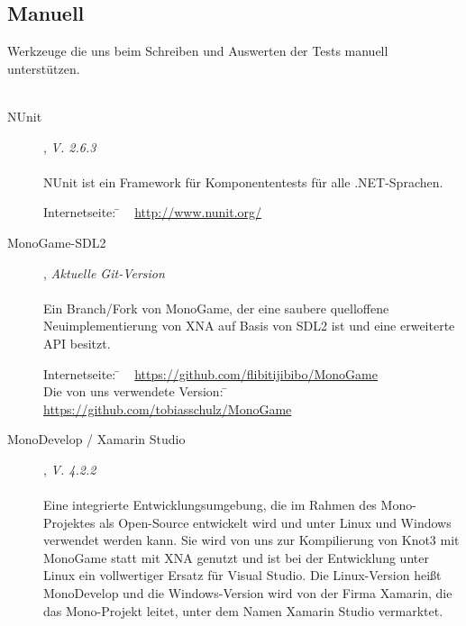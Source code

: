 
\subsection{Manuell}
\label{Abschnitt:Programmfehler:Werkzeuge:Manuell}

Werkzeuge die uns beim Schreiben und Auswerten der Tests manuell unterstützen.
\\
\\

\begin{description}

	\item[NUnit], \textit{V. 2.6.3}\hfill
	\\
	\\
	NUnit ist ein Framework für Komponententests für alle .NET-Sprachen.
	
	\begin{tabbing}
		Internetseite:
		\= ~ \href {http://www.nunit.org/}
	    	       {http://www.nunit.org/}
	    \\
	\end{tabbing}
	
	\item[MonoGame-SDL2], \textit{Aktuelle Git-Version}\hfill
	\\
	\\
	Ein Branch/Fork von MonoGame, der eine saubere quelloffene Neuimplementierung von XNA auf Basis von SDL2 ist und eine erweiterte API besitzt.
	
	\begin{tabbing}
		Internetseite:
		\= ~ \href {https://github.com/flibitijibibo/MonoGame}
	    	       {https://github.com/flibitijibibo/MonoGame}
	    \\
		Die von uns verwendete Version:
		\= ~ \href {https://github.com/tobiasschulz/MonoGame}
	    	       {https://github.com/tobiasschulz/MonoGame}
	    \\
	\end{tabbing}
	
	\item[MonoDevelop / Xamarin Studio], \textit{V. 4.2.2}\hfill
	\\
	\\
	Eine integrierte Entwicklungsumgebung, die im Rahmen des Mono-Projektes als Open-Source entwickelt wird und unter Linux und Windows verwendet werden kann.
	Sie wird von uns zur Kompilierung von Knot3 mit MonoGame statt mit XNA genutzt und ist bei der Entwicklung unter Linux ein vollwertiger Ersatz für Visual Studio.
	Die Linux-Version heißt MonoDevelop und die Windows-Version wird von der Firma Xamarin, die das Mono-Projekt leitet, unter dem Namen Xamarin Studio vermarktet.
	

\end{description}
